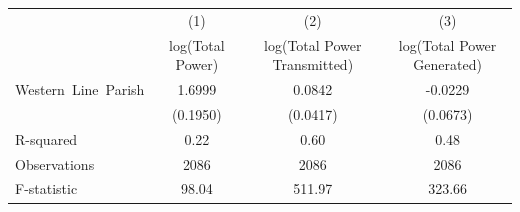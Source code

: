 \begin{tabular}{lccc}
\toprule
& (1) & (2) & (3) \\
& log(Total Power) & log(Total Power Transmitted) & log(Total Power Generated) \\
\midrule
Western\ Line\ Parish & 1.6999\sym{***} & 0.0842\sym{**} & -0.0229 \\
& (0.1950) & (0.0417) & (0.0673) \\
R-squared & 0.22 & 0.60 & 0.48 \\
Observations & 2086 & 2086 & 2086 \\
F-statistic & 98.04 & 511.97 & 323.66 \\
\bottomrule
\end{tabular}
